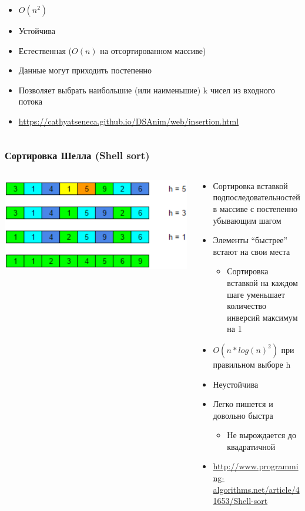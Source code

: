 \documentclass[xetex,mathserif,serif]{beamer}
\begin{document}
\begin{frame}
\begin{columns}
\begin{column}{0.75\textwidth}
				\begin{itemize}
					\item $O(n^2)$
					\item Устойчива
					\item Естественная ($O(n)$ на отсортированном массиве)
					\item Данные могут приходить постепенно
					\item Позволяет выбрать наибольшие (или наименьшие) k чисел из входного потока
					\item \url{https://cathyatseneca.github.io/DSAnim/web/insertion.html}
				\end{itemize}
			\end{column}
		\end{columns}
	\end{frame}

	\begin{frame}
		\frametitle{Сортировка Шелла (Shell sort)}
		\begin{columns}
			\begin{column}{0.35\textwidth}
				\includegraphics[width=\textwidth]{shellSort.png}
			\end{column}
			\begin{column}{0.65\textwidth}
				\begin{itemize}
					\item Сортировка вставкой подпоследовательностей в массиве с постепенно убывающим шагом
					\item Элементы ``быстрее'' встают на свои места
					\begin{itemize}
						\item Сортировка вставкой на каждом шаге уменьшает количество инверсий максимум на 1
					\end{itemize}
					\item $O(n * log(n)^2)$ при правильном выборе h
					\item Неустойчива
					\item Легко пишется и довольно быстра
					\begin{itemize}
						\item Не вырождается до квадратичной
					\end{itemize}
					\item \url{http://www.programming-algorithms.net/article/41653/Shell-sort}
				\end{itemize}
			\end{column}
		\end{columns}
	\end{frame}
\end{document}
